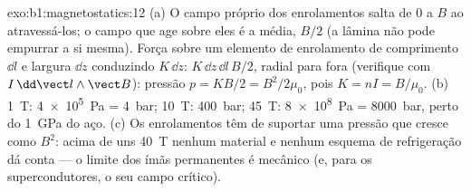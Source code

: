 \begin{solution}{exo:b1:magnetostatics:12}
(a) O campo próprio dos enrolamentos salta de $0$ a $B$ ao atravessá-los; o
campo que age sobre eles é a média, $B/2$ (a lâmina não pode empurrar a si
mesma). Força sobre um elemento de enrolamento de comprimento $\dd l$ e largura $\dd z$
conduzindo $K\,\dd z$: $K\,\dd z\,\dd l\,B/2$, radial para fora (verifique com $I\,\dd\vect l
\wedge\vect B$): pressão $p = KB/2 = B^2/2\mu_0$, pois $K = nI = B/\mu_0$.
(b) \qty{1}{T}: \qty{4e5}{Pa} = \qty{4}{bar}; \qty{10}{T}: \qty{400}{bar}; \qty{45}{T}:
\qty{8e8}{Pa} = \qty{8000}{bar}, perto do \qty{1}{GPa} do aço. (c) Os
enrolamentos têm de suportar uma pressão que cresce como $B^2$: acima de uns \qty{40}{T}
nenhum material e nenhum esquema de refrigeração dá conta --- o limite dos ímãs permanentes
é mecânico (e, para os supercondutores, o seu campo crítico).
\end{solution}


